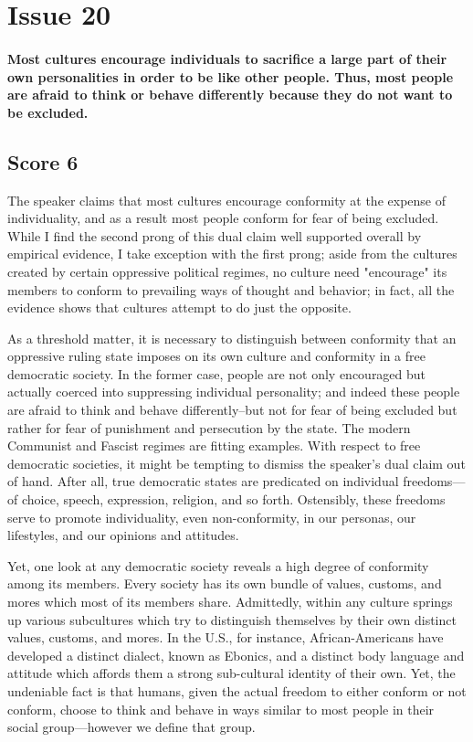 \section{Issue 20}
\paragraph{
Most cultures encourage individuals to sacrifice a large part of their own personalities in order to be like other people.
Thus, most people are afraid to think or behave differently because they do not want to be excluded.
}
\subsection{Score 6}


The speaker claims that most cultures encourage conformity at the expense of individuality, and as a result most people conform for fear of being excluded.
While I find the second prong of this dual claim well supported overall by empirical evidence, I take exception with the first prong; aside from the cultures created by certain oppressive political regimes, no culture need "encourage" its members to conform to prevailing ways of thought and behavior; in fact, all the evidence shows that cultures attempt to do just the opposite.


As a threshold matter, it is necessary to distinguish between conformity that an oppressive ruling state imposes on its own culture and conformity in a free democratic society.
In the former case, people are not only encouraged but actually coerced into suppressing individual personality; and indeed these people are afraid to think and behave differently--but not for fear of being excluded but rather for fear of punishment and persecution by the state.
The modern Communist and Fascist regimes are fitting examples.
With respect to free democratic societies, it might be tempting to dismiss the speaker's dual claim out of hand.
After all, true democratic states are predicated on individual freedoms---of choice, speech, expression, religion, and so forth.
Ostensibly, these freedoms serve to promote individuality, even non-conformity, in our personas, our lifestyles, and our opinions and attitudes.


Yet, one look at any democratic society reveals a high degree of conformity among its members.
Every society has its own bundle of values, customs, and mores which most of its members share.
Admittedly, within any culture springs up various subcultures which try to distinguish themselves by their own distinct values, customs, and mores.
In the U.S., for instance, African-Americans have developed a distinct dialect, known as Ebonics, and a distinct body language and attitude which affords them a strong sub-cultural identity of their own.
Yet, the undeniable fact is that humans, given the actual freedom to either conform or not conform, choose to think and behave in ways similar to most people in their social group---however we define that group.


